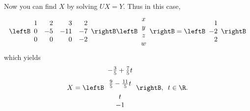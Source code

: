 \begin{solution}
Now you can find $X$ by solving $UX=Y$. Thus in this case, 
\begin{equation*}
\leftB 
\begin{array}{rrrr}
1 & 2 & 3 & 2 \\ 
0 & -5 & -11 & -7 \\ 
0 & 0 & 0 & -2
\end{array}
\rightB \leftB 
\begin{array}{c}
x \\ 
y \\ 
z \\ 
w
\end{array}
\rightB =\leftB 
\begin{array}{r}
1 \\ 
-2 \\ 
2
\end{array}
\rightB
\end{equation*}
which yields 
\begin{equation*}
X=\leftB 
\begin{array}{c}
-
\vspace{0.05in}\frac{3}{5}+\vspace{0.05in}\frac{7}{5}t \\ 
\vspace{0.05in}\frac{9}{5}-\vspace{0.05in}\frac{11}{5}t \\ 
t \\ 
-1
\end{array}
\rightB ,\enspace t\in \R\text{.}
\end{equation*}

\end{solution}